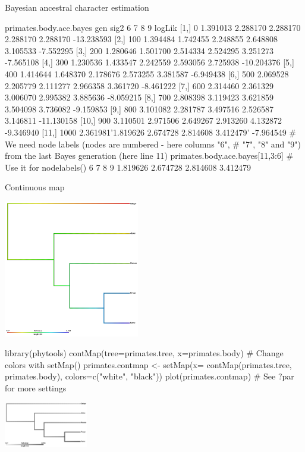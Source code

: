 \documentclass[compress, ucs, xelatex, 11pt, xcolor=svgnames,
  hyperref={
    bookmarks=true,
    unicode=true,
    colorlinks=true,
    pdftitle={Molecular data in R},
    plainpages=false,
    pdfauthor={Vojtech Zeisek},
    pdfsubject={Course about phylogeny and evolution in R},
    pdfcreator={XeLaTeX},
    pdfkeywords={R, evolution, phylogeny, molecular data},
    linkcolor=Tomato,
    anchorcolor=SaddleBrown,
    citecolor=Goldenrod,
    filecolor=DarkMagenta,
    menucolor=Sienna,
    urlcolor=DarkTurquoise,
    pdftex},
  url={hyphens, lowtilde} %
  ]{beamer}
\begin{document}
\begin{frame}[fragile]{Bayesian ancestral character estimation}
  \begin{spluscode}
    primates.body.ace.bayes
           gen     sig2        6        7        8        9     logLik
     [1,]    0 1.391013 2.288170 2.288170 2.288170 2.288170 -13.238593
     [2,]  100 1.394484 1.742455 2.248855 2.648808 3.105533  -7.552295
     [3,]  200 1.280646 1.501700 2.514334 2.524295 3.251273  -7.565108
     [4,]  300 1.230536 1.433547 2.242559 2.593056 2.725938 -10.204376
     [5,]  400 1.414644 1.648370 2.178676 2.573255 3.381587  -6.949438
     [6,]  500 2.069528 2.205779 2.111277 2.966358 3.361720  -8.461222
     [7,]  600 2.314460 2.361329 3.006070 2.995382 3.885636  -8.059215
     [8,]  700 2.808398 3.119423 3.621859 3.504098 3.736082  -9.159853
     [9,]  800 3.101082 2.281787 3.497516 2.526587 3.146811 -11.130158
    [10,]  900 3.110501 2.971506 2.649267 2.913260 4.132872  -9.346940
    [11,] 1000 2.361981'1.819626 2.674728 2.814608 3.412479' -7.964549
    # We need node labels (nodes are numbered - here columns "6",
    # "7", "8" and "9") from the last Bayes generation (here line 11)
    primates.body.ace.bayes[11,3:6] # Use it for nodelabels()
           6        7        8        9
    1.819626 2.674728 2.814608 3.412479
  \end{spluscode}
\end{frame}

\begin{frame}[fragile]{Continuous map}
\begin{multicols}{2}
  \includegraphics[height=6cm]{contmap.png}
  \begin{spluscode}
    library(phytools)
    contMap(tree=primates.tree,
      x=primates.body)
    # Change colors with setMap()
    primates.contmap <- setMap(x=
      contMap(primates.tree,
      primates.body),
      colors=c("white", "black"))
    plot(primates.contmap)
    # See ?par for more settings
  \end{spluscode}
  \begin{center}
    \includegraphics[height=2cm]{contmapbw.png}
  \end{center}
\end{multicols}
\end{frame}
\end{document}
